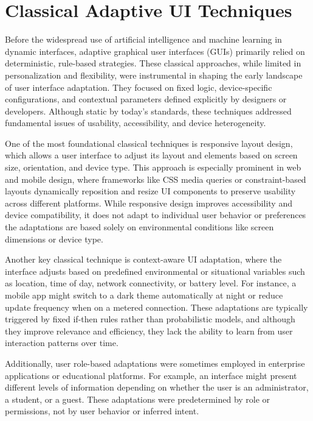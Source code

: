 \documentclass[openany]{book}
\begin{document}
\section{Classical Adaptive UI Techniques}
Before the widespread use of artificial intelligence and machine learning in dynamic interfaces, adaptive graphical user interfaces (GUIs) primarily relied on deterministic, rule-based strategies. These classical approaches, while limited in personalization and flexibility, were instrumental in shaping the early landscape of user interface adaptation. They focused on fixed logic, device-specific configurations, and contextual parameters defined explicitly by designers or developers. Although static by today’s standards, these techniques addressed fundamental issues of usability, accessibility, and device heterogeneity.

One of the most foundational classical techniques is responsive layout design, which allows a user interface to adjust its layout and elements based on screen size, orientation, and device type. This approach is especially prominent in web and mobile design, where frameworks like CSS media queries or constraint-based layouts dynamically reposition and resize UI components to preserve usability across different platforms. While responsive design improves accessibility and device compatibility, it does not adapt to individual user behavior or preferences the adaptations are based solely on environmental conditions like screen dimensions or device type.

Another key classical technique is context-aware UI adaptation, where the interface adjusts based on predefined environmental or situational variables such as location, time of day, network connectivity, or battery level. For instance, a mobile app might switch to a dark theme automatically at night or reduce update frequency when on a metered connection. These adaptations are typically triggered by fixed if-then rules rather than probabilistic models, and although they improve relevance and efficiency, they lack the ability to learn from user interaction patterns over time.

Additionally, user role-based adaptations were sometimes employed in enterprise applications or educational platforms. For example, an interface might present different levels of information depending on whether the user is an administrator, a student, or a guest. These adaptations were predetermined by role or permissions, not by user behavior or inferred intent.
\end{document}
